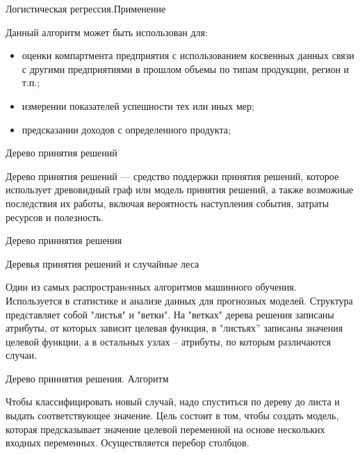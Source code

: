 \documentclass{beamer}
\begin{document}
\begin{frame}{Логистическая регрессия.Применение}

Данный алгоритм может быть использован для:
    \begin{itemize}

  \item оценки компартмента предприятия с использованием косвенных данных связи с другими предприятиями в прошлом объемы по типам продукции, регион и т.п.;
  \item измерении показателей успешности  тех или иных мер;
  \item предсказании доходов с определенного продукта;
    \end{itemize}
    

\end{frame}





\begin{frame}{Дерево принятия решений}

Дерево принятия решений — средство поддержки принятия решений, которое использует 
древовидный граф или модель принятия решений, а также возможные последствия их работы, 
включая вероятность наступления события, затраты ресурсов и полезность. 

\end{frame}


\begin{frame}{Дерево приннятия решения}

Деревья принятия решений и случайные леса

Один из самых распространeнных алгоритмов машинного обучения.
 Используется в статистике и анализе данных для прогнозных моделей. 
 Структура представляет собой "листья" и "ветки". 
 На "ветках" дерева решения записаны атрибуты, 
 от которых зависит целевая функция, в "листьях” записаны значения целевой функции, 
 а в остальных узлах – атрибуты, по которым различаются случаи.

\end{frame}


\begin{frame}{Дерево приннятия решения. Алгоритм}


Чтобы классифицировать новый случай, надо спуститься по дереву до листа и выдать соответствующее значение. 
Цель состоит в том, чтобы создать модель, которая предсказывает значение целевой 
переменной на основе нескольких входных переменных. Осуществляется перебор  столбцов.
\end{frame}
\end{document}
